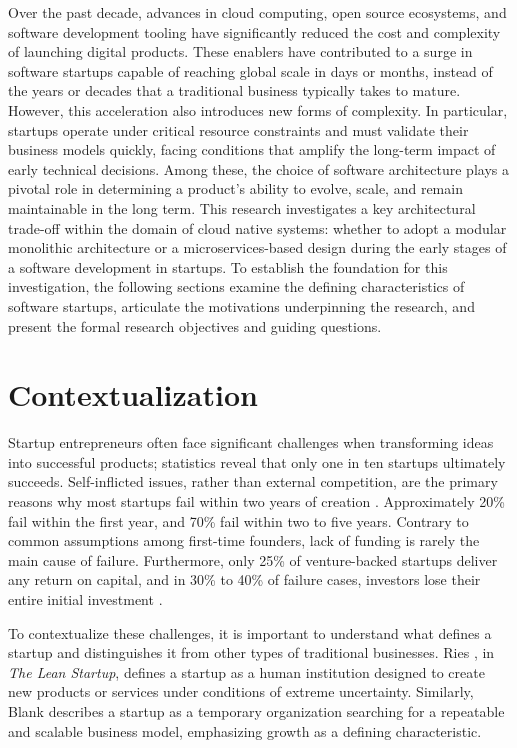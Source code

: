 Over the past decade, advances in cloud computing, open source ecosystems, and software development tooling have significantly reduced the cost and complexity of launching digital products. These enablers have contributed to a surge in software startups capable of reaching global scale in days or months, instead of the years or decades that a traditional business typically takes to mature. However, this acceleration also introduces new forms of complexity. In particular, startups operate under critical resource constraints and must validate their business models quickly, facing conditions that amplify the long-term impact of early technical decisions. Among these, the choice of software architecture plays a pivotal role in determining a product’s ability to evolve, scale, and remain maintainable in the long term. This research investigates a key architectural trade-off within the domain of cloud native systems: whether to adopt a modular monolithic architecture or a microservices-based design during the early stages of a software development in startups. To establish the foundation for this investigation, the following sections examine the defining characteristics of software startups, articulate the motivations underpinning the research, and present the formal research objectives and guiding questions.

\section{Contextualization}
Startup entrepreneurs often face significant challenges when transforming ideas into successful products; statistics reveal that only one in ten startups ultimately succeeds. Self-inflicted issues, rather than external competition, are the primary reasons why most startups fail within two years of creation \cite{crowne2002}. Approximately 20\% fail within the first year, and 70\% fail within two to five years. Contrary to common assumptions among first-time founders, lack of funding is rarely the main cause of failure. Furthermore, only 25\% of venture-backed startups deliver any return on capital, and in 30\% to 40\% of failure cases, investors lose their entire initial investment \cite{demandsage2023}.

To contextualize these challenges, it is important to understand what defines a startup and distinguishes it from other types of traditional businesses. Ries \cite{ries2011}, in \textit{The Lean Startup}, defines a startup as a human institution designed to create new products or services under conditions of extreme uncertainty. Similarly, Blank \cite{blank2012} describes a startup as a temporary organization searching for a repeatable and scalable business model, emphasizing growth as a defining characteristic.

